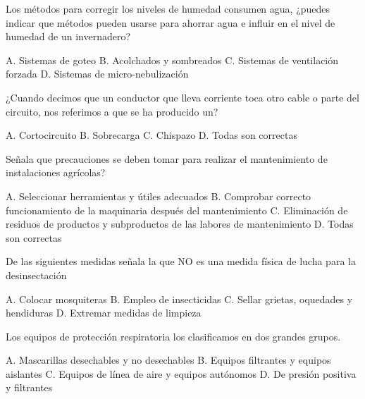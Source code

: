 \documentclass[answers,11pt]{exam}
\begin{document}
{\begin{questions}
  \question Los métodos para corregir los niveles de humedad consumen agua,
    ¿puedes indicar que métodos pueden usarse para ahorrar agua e influir en el
    nivel de humedad de un invernadero?
    \begin{checkboxes}
      \choice A. Sistemas de goteo
      \CorrectChoice B. Acolchados y sombreados
      \choice C. Sistemas de ventilación forzada
      \choice D. Sistemas de micro-nebulización
    \end{checkboxes}
    
  \question ¿Cuando decimos que un conductor que lleva corriente toca otro cable
    o parte del circuito, nos referimos a que se ha producido un?
    \begin{checkboxes}
      \CorrectChoice A. Cortocircuito
      \choice B. Sobrecarga
      \choice C. Chispazo
      \choice D. Todas son correctas
    \end{checkboxes}
    
  \question Señala que precauciones se deben tomar para realizar el mantenimiento
    de instalaciones agrícolas?
    \begin{checkboxes}
      \choice A. Seleccionar herramientas y útiles adecuados
      \choice B. Comprobar correcto funcionamiento de la maquinaria después del
      mantenimiento
      \choice C. Eliminación de residuos de productos y subproductos de las
      labores de mantenimiento
      \CorrectChoice D. Todas son correctas
    \end{checkboxes}

  \question De las siguientes medidas señala la que NO es una medida física de
    lucha para la desinsectación
    \begin{checkboxes}
      \choice A. Colocar mosquiteras
      \CorrectChoice B. Empleo de insecticidas 
      \choice C. Sellar grietas, oquedades y hendiduras
      \choice D. Extremar medidas de limpieza
    \end{checkboxes}

  \question Los equipos de protección respiratoria los clasificamos en dos
    grandes grupos.
    \begin{checkboxes}
      \choice A. Mascarillas desechables y no desechables
      \CorrectChoice B. Equipos filtrantes y equipos aislantes
      \choice C. Equipos de línea de aire y equipos autónomos
      \choice D. De presión positiva y filtrantes
    \end{checkboxes}


\end{questions}}
\end{document}
